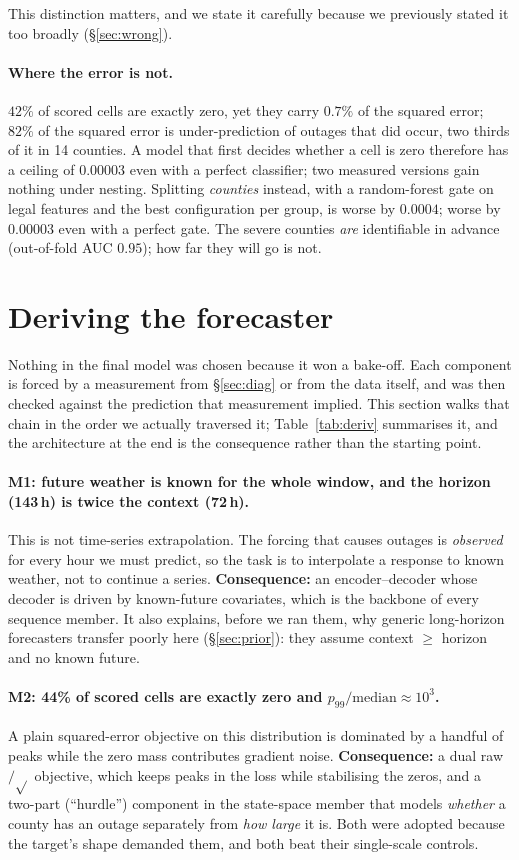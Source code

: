 \documentclass[10pt,letterpaper,twocolumn]{article}
\begin{document}
This distinction matters, and we state it carefully because we previously stated
it too broadly (§\ref{sec:wrong}).

\paragraph{Where the error is not.} $42\%$ of scored cells are exactly zero, yet
they carry $0.7\%$ of the squared error;
$82\%$ of the squared error is under-prediction of outages that did occur,
two thirds of it in 14 counties. A model that first decides whether a cell is
zero therefore has a ceiling of $0.00003$ even with a perfect classifier;
two measured versions gain nothing under nesting. Splitting \emph{counties} instead, with a
random-forest gate on legal features and the best configuration per group,
is worse by $0.0004$; worse by $0.00003$ even with a perfect gate. The
severe counties \emph{are} identifiable in advance (out-of-fold AUC $0.95$);
how far they will go is not.

\section{Deriving the forecaster}
\label{sec:model}

Nothing in the final model was chosen because it won a bake-off. Each component
is forced by a measurement from §\ref{sec:diag} or from the data itself, and was
then checked against the prediction that measurement implied. This section walks
that chain in the order we actually traversed it; Table~\ref{tab:deriv}
summarises it, and the architecture at the end is the consequence rather than
the starting point.

\paragraph{M1: future weather is known for the whole window, and the horizon
(143\,h) is twice the context (72\,h).} This is not time-series extrapolation.
The forcing that causes outages is \emph{observed} for every hour we must
predict, so the task is to interpolate a response to known weather, not to
continue a series. \textbf{Consequence:} an encoder--decoder whose decoder is
driven by known-future covariates, which is the backbone of every sequence
member. It also explains, before we ran them, why generic long-horizon
forecasters transfer poorly here (§\ref{sec:prior}): they assume context $\ge$
horizon and no known future.

\paragraph{M2: 44\% of scored cells are exactly zero and $p_{99}/\mathrm{median}
\approx 10^3$.} A plain squared-error objective on this distribution is
dominated by a handful of peaks while the zero mass contributes gradient noise.
\textbf{Consequence:} a dual raw$/\sqrt{}$ objective, which keeps peaks in the
loss while stabilising the zeros, and a two-part (``hurdle'') component in the
state-space member that models \emph{whether} a county has an outage separately
from \emph{how large} it is. Both were adopted because the target's shape demanded them,
and both beat their single-scale controls.
\end{document}
